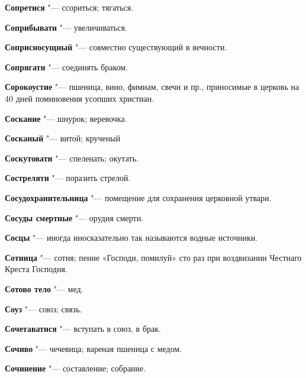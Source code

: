 \begin{mymulticols}{2}
\noindent\textbf{Сопретися} "--- ссориться; тягаться. 




\noindent\textbf{Соприбывати} "--- увеличиваться. 




\noindent\textbf{Соприсносущный} "--- совместно существующий в вечности. 




\noindent\textbf{Сопрягати} "--- соединять браком. 




\noindent\textbf{Сорокоустие} "--- пшеница, вино, фимиам, свечи и пр., приносимые в церковь на 40 дней поминовения усопших христиан. 




\noindent\textbf{Соскание} "--- шнурок; веревочка. 




\noindent\textbf{Сосканый} "--- витой; крученый 




\noindent\textbf{Соскутовати} "--- спеленать; окутать. 




\noindent\textbf{Состреляти} "--- поразить стрелой. 




\noindent\textbf{Сосудохранительница} "--- помещение для сохранения церковной утвари. 




\noindent\textbf{Сосуды смертные} "--- орудия смерти. 




\noindent\textbf{Сосцы} "--- иногда иносказательно так называются водные источники. 




\noindent\textbf{Сотница} "--- сотня; пение «Господи, помилуй» сто раз при воздвизании Честнаго Креста Господня. 




\noindent\textbf{Сотово тело} "--- мед. 




\noindent\textbf{Соуз} "--- союз; связь. 




\noindent\textbf{Сочетаватися} "--- вступать в союз, в брак. 




\noindent\textbf{Сочиво} "--- чечевица; вареная пшеница с медом. 




\noindent\textbf{Сочинение} "--- составление; собрание. 





\end{mymulticols}

